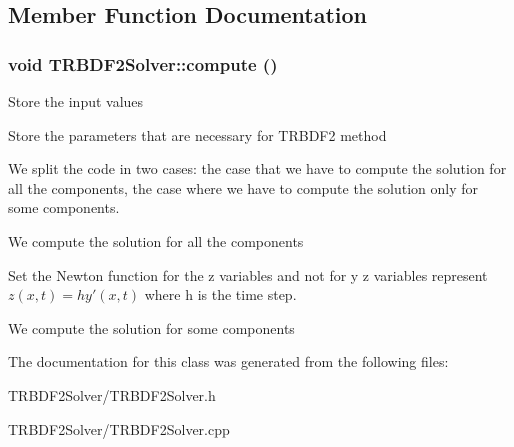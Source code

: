 \subsection{Member Function Documentation}
\hypertarget{classTRBDF2Solver_a852ad825d56d976c1654135a8eb449a1}{
\subsubsection[{compute}]{\setlength{\rightskip}{0pt plus 5cm}void TRBDF2Solver::compute ()}}
\label{classTRBDF2Solver_a852ad825d56d976c1654135a8eb449a1}


Store the input values

Store the parameters that are necessary for TRBDF2 method

We split the code in two cases: the case that we have to compute the solution for all the components, the case where we have to compute the solution only for some components.

We compute the solution for all the components

Set the Newton function for the z variables and not for y z variables represent $ z(x,t) = h y'(x,t) $ where h is the time step.

We compute the solution for some components 

The documentation for this class was generated from the following files:\begin{DoxyCompactItemize}
\item 
TRBDF2Solver/TRBDF2Solver.h\item 
TRBDF2Solver/TRBDF2Solver.cpp\end{DoxyCompactItemize}
